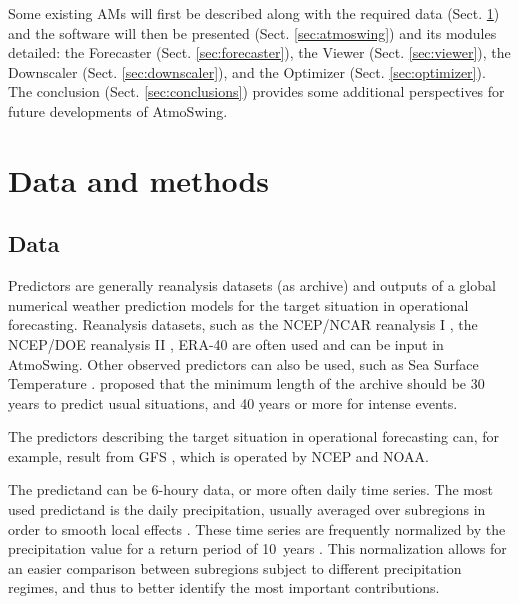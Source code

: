 \documentclass[review]{elsarticle}
\begin{document}
Some existing AMs will first be described along with the required data (Sect. \ref{sec:data_methods}) and the software will then be presented (Sect. \ref{sec:atmoswing}) and its modules detailed: the Forecaster (Sect. \ref{sec:forecaster}), the Viewer (Sect. \ref{sec:viewer}), the Downscaler (Sect. \ref{sec:downscaler}), and the Optimizer (Sect. \ref{sec:optimizer}). The conclusion (Sect. \ref{sec:conclusions}) provides some additional perspectives for future developments of AtmoSwing. 


\section{Data and methods}
\label{sec:data_methods}








\subsection{Data}
\label{sec:data}

Predictors are generally reanalysis datasets (as archive) and outputs of a global numerical weather prediction models for the target situation in operational forecasting. Reanalysis datasets, such as the NCEP/NCAR reanalysis I \citep[6-hourly, 17 pressure levels at a resolution of 2.5\degree, see][]{Kalnay1996}, the NCEP/DOE reanalysis II \citep{Kanamitsu2002}, ERA-40 \citep{Uppala2005} are often used and can be input in AtmoSwing. Other observed predictors can also be used, such as Sea Surface Temperature \citep[SST, ][]{Reynolds2007}. \citet{Bontron2004} proposed that the minimum length of the archive should be 30 years to predict usual situations, and 40 years or more for intense events.

The predictors describing the target situation in operational forecasting can, for example, result from GFS \citep[Global Forecast System,][]{Kanamitsu1991,Kanamitsu1989}, which is operated by NCEP and NOAA.

The predictand can be 6-houry data, or more often daily time series. The most used predictand is the daily precipitation, usually averaged over subregions in order to smooth local effects \citep{Obled2002, Marty2012}. These time series are frequently normalized by the precipitation value for a return period of 10~years \citep{Djerboua2001}. This normalization allows for an easier comparison between subregions subject to different precipitation regimes, and thus to better identify the most important contributions.
\end{document}
